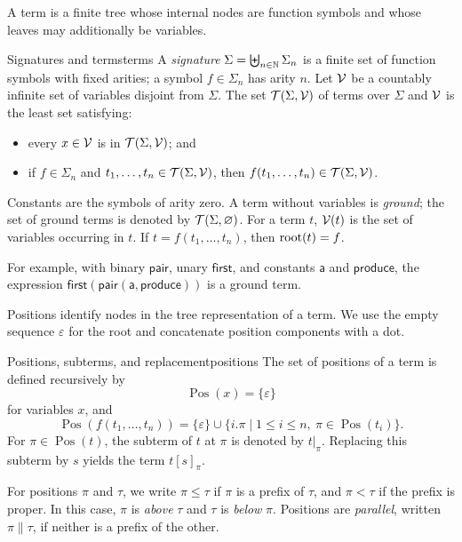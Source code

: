 A term is a finite tree whose internal nodes are function symbols and whose
leaves may additionally be variables.

\begin{Definition}{Signatures and terms}{terms}
  A \emph{signature} $\Sigma=\biguplus_{n\in\mathbb{N}}\Sigma_n$ is a finite set of
  function symbols with fixed arities; a symbol $f\in\Sigma_n$ has arity
  $n$.  Let $\mathcal{V}$ be a countably infinite set of variables disjoint from
  $\Sigma$.  The set $\mathcal{T}\!\left(\Sigma,\mathcal{V}\right)$ of terms over $\Sigma$ and $\mathcal{V}$
  is the least set satisfying:
  \begin{itemize}
    \item every $x\in\mathcal{V}$ is in $\mathcal{T}\!\left(\Sigma,\mathcal{V}\right)$; and
    \item if $f\in\Sigma_n$ and $t_1,\ldots,t_n\in\mathcal{T}\!\left(\Sigma,\mathcal{V}\right)$,
          then $f(t_1,\ldots,t_n)\in\mathcal{T}\!\left(\Sigma,\mathcal{V}\right)$.
  \end{itemize}
  Constants are the symbols of arity zero.  A term without variables is
  \emph{ground}; the set of ground terms is denoted by $\mathcal{T}\!\left(\Sigma,\varnothing\right)$.
  For a term $t$, $\mathcal{V}(t)$ is the set of variables occurring in $t$.  If
  $t=f(t_1,\ldots,t_n)$, then $\operatorname{root}(t)=f$.
\end{Definition}

For example, with binary $\mathsf{pair}$, unary $\mathsf{first}$, and constants
$\mathsf a$ and $\mathsf{produce}$, the expression
$\mathsf{first}(\mathsf{pair}(\mathsf a,\mathsf{produce}))$ is a ground term.

Positions identify nodes in the tree representation of a term.  We use the
empty sequence $\varepsilon$ for the root and concatenate position components
with a dot.

\begin{Definition}{Positions, subterms, and replacement}{positions}
  The set of positions of a term is defined recursively by
  \[
    \operatorname{Pos}(x)=\{\varepsilon\}
  \]
  for variables $x$, and
  \[
    \operatorname{Pos}(f(t_1,\ldots,t_n))
      =\{\varepsilon\}\cup
        \{i.\pi\mid 1\leq i\leq n,\ \pi\in\operatorname{Pos}(t_i)\}.
  \]
  For $\pi\in\operatorname{Pos}(t)$, the subterm of $t$ at $\pi$ is denoted
  by $t|_\pi$.  Replacing this subterm by $s$ yields the term $t[s]_\pi$.

  For positions $\pi$ and $\tau$, we write $\pi\leq\tau$ if $\pi$ is a
  prefix of $\tau$, and $\pi<\tau$ if the prefix is proper.  In this case,
  $\pi$ is \emph{above} $\tau$ and $\tau$ is \emph{below} $\pi$.  Positions
  are \emph{parallel}, written $\pi\parallel\tau$, if neither is a prefix of
  the other.
\end{Definition}

